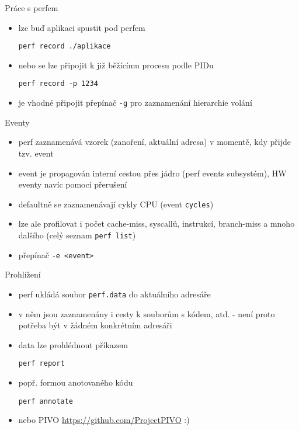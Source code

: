 \documentclass{beamer}
\begin{document}
\begin{xframe}{Práce s perfem}
	\begin{itemize}
		\item lze buď aplikaci spustit pod perfem
\begin{lstlisting}[basicstyle=\fontsize{8}{9}\selectfont\ttfamily]
perf record ./aplikace
\end{lstlisting}
		\item nebo se lze připojit k již běžícímu procesu podle PIDu
\begin{lstlisting}[basicstyle=\fontsize{8}{9}\selectfont\ttfamily]
perf record -p 1234
\end{lstlisting}
		\item je vhodné připojit přepínač \texttt{-g} pro zaznamenání hierarchie volání
	\end{itemize}
\end{xframe}

\begin{xframe}{Eventy}
	\begin{itemize}
		\item perf zaznamenává vzorek (zanoření, aktuální adresa) v momentě, kdy přijde tzv. event
		\item event je propagován interní cestou přes jádro (perf events subsystém), HW eventy navíc pomocí přerušení
		\item defaultně se zaznamenávají cykly CPU (event \texttt{cycles})
		\item lze ale profilovat i počet cache-miss, syscallů, instrukcí, branch-miss a mnoho dalšího (celý seznam \texttt{perf list})
		\item přepínač \texttt{-e <event>}
	\end{itemize}
\end{xframe}

\begin{xframe}{Prohlížení}
	\begin{itemize}
		\item perf ukládá soubor \texttt{perf.data} do aktuálního adresáře
		\item v něm jsou zaznamenány i cesty k souborům s kódem, atd. - není proto potřeba být v žádném konkrétním adresáři
		\item data lze prohlédnout příkazem
\begin{lstlisting}[basicstyle=\fontsize{8}{9}\selectfont\ttfamily]
perf report
\end{lstlisting}
		\item popř. formou anotovaného kódu
\begin{lstlisting}[basicstyle=\fontsize{8}{9}\selectfont\ttfamily]
perf annotate
\end{lstlisting}
		\item nebo PIVO \url{https://github.com/ProjectPIVO} :)
	\end{itemize}
\end{xframe}
\end{document}
